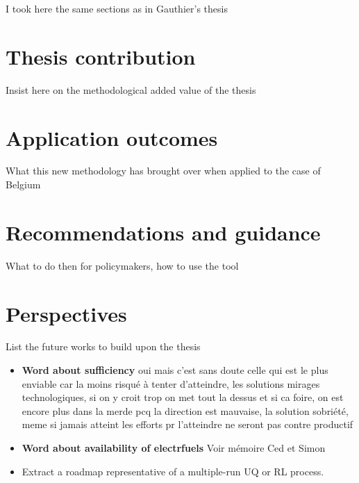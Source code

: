 I took here the same sections as in Gauthier's thesis
\section*{Thesis contribution}
Insist here on the methodological added value of the thesis

\section*{Application outcomes}
What this new methodology has brought over when applied to the case of Belgium

\section*{Recommendations and guidance}
What to do then for policymakers, how to use the tool

\section*{Perspectives}
List the future works to build upon the thesis

\begin{itemize}
\item \textbf{Word about sufficiency} oui mais c'est sans doute celle qui est le plus enviable car la moins risqué à tenter d'atteindre, les solutions mirages technologiques, si on y croit trop on met tout la dessus et si ca foire, on est encore plus dans la merde pcq la direction est mauvaise, la solution sobriété, meme si jamais atteint les efforts pr l'atteindre ne seront pas contre productif
\item \textbf{Word about availability of electrfuels} Voir mémoire Ced et Simon
\item Extract a roadmap representative of a multiple-run UQ or RL process.
\end{itemize}


